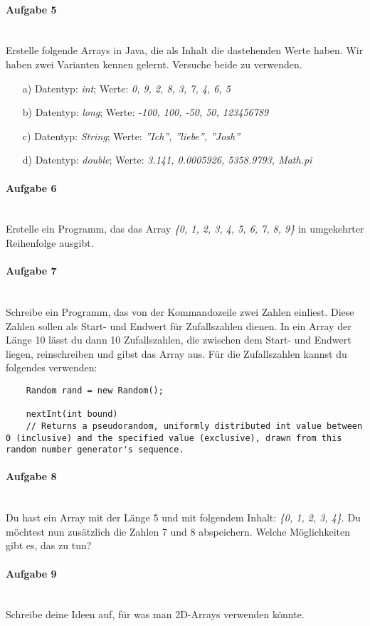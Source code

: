 \documentclass[12pt,a4paper,ngerman]{scrartcl}
\begin{document}
	\paragraph{Aufgabe 5}\mbox{}\\
	Erstelle folgende Arrays in Java, die als Inhalt die dastehenden Werte haben. Wir haben zwei Varianten kennen gelernt. Versuche beide zu verwenden.
	
	\begin{itemize}
		\item[a)] Datentyp: \emph{int}; Werte: \emph{0, 9, 2, 8, 3, 7, 4, 6, 5}
		\item[b)] Datentyp: \emph{long}; Werte: \emph{-100, 100, -50, 50, 123456789}
		\item[c)] Datentyp: \emph{String}; Werte: \emph{''Ich'', ''liebe'', ''Josh''}
		\item[d)] Datentyp: \emph{double}; Werte: \emph{3.141, 0.0005926, 5358.9793, Math.pi}
	\end{itemize}

	\paragraph{Aufgabe 6}\mbox{}\\
	Erstelle ein Programm, das das Array \emph{\{0, 1, 2, 3, 4, 5, 6, 7, 8, 9\}} in umgekehrter Reihenfolge ausgibt.
	
	\paragraph{Aufgabe 7}\mbox{}\\
	Schreibe ein Programm, das von der Kommandozeile zwei Zahlen einliest. Diese Zahlen sollen als Start- und Endwert für Zufallszahlen dienen. In ein Array der Länge 10 lässt du dann 10 Zufallszahlen, die zwischen dem Start- und Endwert liegen, reinschreiben und gibst das Array aus.
	Für die Zufallszahlen kannst du folgendes verwenden:
	
	\begin{lstlisting}
	Random rand = new Random();
	
	nextInt(int bound)
	// Returns a pseudorandom, uniformly distributed int value between 0 (inclusive) and the specified value (exclusive), drawn from this random number generator's sequence.
	\end{lstlisting}
	
	\paragraph{Aufgabe 8}\mbox{}\\
	Du hast ein Array mit der Länge 5 und mit folgendem Inhalt: \emph{\{0, 1, 2, 3, 4\}}. Du möchtest nun zusätzlich die Zahlen 7 und 8 abspeichern. Welche Möglichkeiten gibt es, das zu tun?
	
	\paragraph{Aufgabe 9}\mbox{}\\
	Schreibe deine Ideen auf, für was man 2D-Arrays verwenden könnte.
\end{document}
